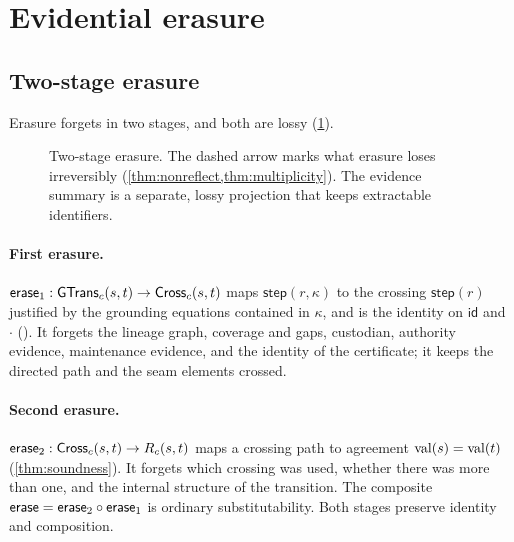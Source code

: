 \section{Evidential erasure}\label{sec:erasure}

\subsection{Two-stage erasure}
Erasure forgets in two stages, and both are lossy (\cref{fig:erasure}).
\begin{figure}[t]
\centering
{}
\caption{Two-stage erasure. The dashed arrow marks what erasure loses irreversibly (\cref{thm:nonreflect,thm:multiplicity}). The evidence summary is a separate, lossy projection that keeps extractable identifiers.}
\label{fig:erasure}
\end{figure}

\paragraph{First erasure.}
$\mathsf{erase}_1 : \mathsf{GTrans}_c(s,t) \to \mathsf{Cross}_c(s,t)$ maps $\mathsf{step}(r,\kappa)$ to the crossing $\mathsf{step}(r)$ justified by the grounding equations contained in $\kappa$, and is the identity on $\mathsf{id}$ and $\cdot$ (). It forgets the lineage graph, coverage and gaps, custodian, authority evidence, maintenance evidence, and the identity of the certificate; it keeps the directed path and the seam elements crossed.

\paragraph{Second erasure.}
$\mathsf{erase}_2 : \mathsf{Cross}_c(s,t) \to R_c(s,t)$ maps a crossing path to agreement $\mathrm{val}(s) = \mathrm{val}(t)$ (\cref{thm:soundness}). It forgets which crossing was used, whether there was more than one, and the internal structure of the transition. The composite $\mathsf{erase} = \mathsf{erase}_2 \circ \mathsf{erase}_1$ is ordinary substitutability. Both stages preserve identity and composition.

